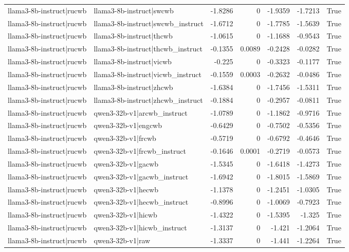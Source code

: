\begin{table}
\begin{tabular}{l l r r r r l}
llama3-8b-instruct|rucwb & llama3-8b-instruct|swcwb & -1.8286 & 0 & -1.9359 & -1.7213 & True \\
llama3-8b-instruct|rucwb & llama3-8b-instruct|swcwb_instruct & -1.6712 & 0 & -1.7785 & -1.5639 & True \\
llama3-8b-instruct|rucwb & llama3-8b-instruct|thcwb & -1.0615 & 0 & -1.1688 & -0.9543 & True \\
llama3-8b-instruct|rucwb & llama3-8b-instruct|thcwb_instruct & -0.1355 & 0.0089 & -0.2428 & -0.0282 & True \\
llama3-8b-instruct|rucwb & llama3-8b-instruct|vicwb & -0.225 & 0 & -0.3323 & -0.1177 & True \\
llama3-8b-instruct|rucwb & llama3-8b-instruct|vicwb_instruct & -0.1559 & 0.0003 & -0.2632 & -0.0486 & True \\
llama3-8b-instruct|rucwb & llama3-8b-instruct|zhcwb & -1.6384 & 0 & -1.7456 & -1.5311 & True \\
llama3-8b-instruct|rucwb & llama3-8b-instruct|zhcwb_instruct & -0.1884 & 0 & -0.2957 & -0.0811 & True \\
llama3-8b-instruct|rucwb & qwen3-32b-v1|arcwb_instruct & -1.0789 & 0 & -1.1862 & -0.9716 & True \\
llama3-8b-instruct|rucwb & qwen3-32b-v1|engcwb & -0.6429 & 0 & -0.7502 & -0.5356 & True \\
llama3-8b-instruct|rucwb & qwen3-32b-v1|frcwb & -0.5719 & 0 & -0.6792 & -0.4646 & True \\
llama3-8b-instruct|rucwb & qwen3-32b-v1|frcwb_instruct & -0.1646 & 0.0001 & -0.2719 & -0.0573 & True \\
llama3-8b-instruct|rucwb & qwen3-32b-v1|gacwb & -1.5345 & 0 & -1.6418 & -1.4273 & True \\
llama3-8b-instruct|rucwb & qwen3-32b-v1|gacwb_instruct & -1.6942 & 0 & -1.8015 & -1.5869 & True \\
llama3-8b-instruct|rucwb & qwen3-32b-v1|hecwb & -1.1378 & 0 & -1.2451 & -1.0305 & True \\
llama3-8b-instruct|rucwb & qwen3-32b-v1|hecwb_instruct & -0.8996 & 0 & -1.0069 & -0.7923 & True \\
llama3-8b-instruct|rucwb & qwen3-32b-v1|hicwb & -1.4322 & 0 & -1.5395 & -1.325 & True \\
llama3-8b-instruct|rucwb & qwen3-32b-v1|hicwb_instruct & -1.3137 & 0 & -1.421 & -1.2064 & True \\
llama3-8b-instruct|rucwb & qwen3-32b-v1|raw & -1.3337 & 0 & -1.441 & -1.2264 & True \\

\end{tabular}
\end{table}
